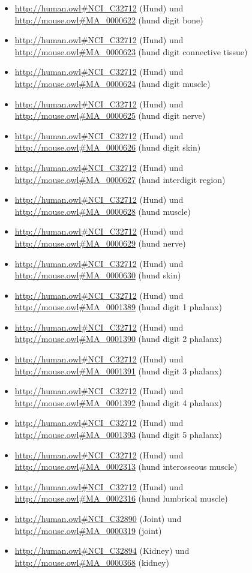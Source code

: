 \begin{itemize}
	\item \url{http://human.owl#NCI_C32712} (Hund) und \url{http://mouse.owl#MA_0000622} (hund digit bone)
	\item \url{http://human.owl#NCI_C32712} (Hund) und \url{http://mouse.owl#MA_0000623} (hund digit connective tissue)
	\item \url{http://human.owl#NCI_C32712} (Hund) und \url{http://mouse.owl#MA_0000624} (hund digit muscle)
	\item \url{http://human.owl#NCI_C32712} (Hund) und \url{http://mouse.owl#MA_0000625} (hund digit nerve)
	\item \url{http://human.owl#NCI_C32712} (Hund) und \url{http://mouse.owl#MA_0000626} (hund digit skin)
	\item \url{http://human.owl#NCI_C32712} (Hund) und \url{http://mouse.owl#MA_0000627} (hund interdigit region)
	\item \url{http://human.owl#NCI_C32712} (Hund) und \url{http://mouse.owl#MA_0000628} (hund muscle)
	\item \url{http://human.owl#NCI_C32712} (Hund) und \url{http://mouse.owl#MA_0000629} (hund nerve)
	\item \url{http://human.owl#NCI_C32712} (Hund) und \url{http://mouse.owl#MA_0000630} (hund skin)
	\item \url{http://human.owl#NCI_C32712} (Hund) und \url{http://mouse.owl#MA_0001389} (hund digit 1 phalanx)
	\item \url{http://human.owl#NCI_C32712} (Hund) und \url{http://mouse.owl#MA_0001390} (hund digit 2 phalanx)
	\item \url{http://human.owl#NCI_C32712} (Hund) und \url{http://mouse.owl#MA_0001391} (hund digit 3 phalanx)
	\item \url{http://human.owl#NCI_C32712} (Hund) und \url{http://mouse.owl#MA_0001392} (hund digit 4 phalanx)
	\item \url{http://human.owl#NCI_C32712} (Hund) und \url{http://mouse.owl#MA_0001393} (hund digit 5 phalanx)
	\item \url{http://human.owl#NCI_C32712} (Hund) und \url{http://mouse.owl#MA_0002313} (hund interosseous muscle)
	\item \url{http://human.owl#NCI_C32712} (Hund) und \url{http://mouse.owl#MA_0002316} (hund lumbrical muscle)
	\item \url{http://human.owl#NCI_C32890} (Joint\textunderscoreof\textunderscorethe\textunderscorePelvic\textunderscoreGirdle) und \url{http://mouse.owl#MA_0000319} (joint)
	\item \url{http://human.owl#NCI_C32894} (Kidney\textunderscoreLower\textunderscoreLobe) und \url{http://mouse.owl#MA_0000368} (kidney)

\end{itemize}
